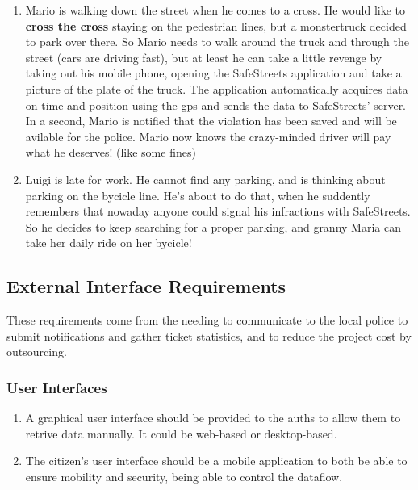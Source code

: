 \documentclass{article}
\newcommand{\enum}[1]{\texttt{#1.\arabic*}}
\begin{document}
			\begin{enumerate}[label=\enum{S}]
				\item \label{S_The man, the street and the monstertruck}
				Mario is walking down the street when he comes to a cross. He would like to \textbf{cross the cross} staying on the pedestrian lines, but a monstertruck decided to park over there. So Mario needs to walk around the truck and through the street (cars are driving fast), but at least he can take a little revenge by taking out his mobile phone, opening the SafeStreets application and take a picture of the plate of the truck. The application automatically acquires data on time and position using the gps and sends the data to SafeStreets' server. In a second, Mario is notified that the violation has been saved and will be avilable for the police.
Mario now knows the crazy-minded driver will pay what he deserves! (like some fines)
				\item \label{S_Prevent is better than healing}Luigi is late for work. He cannot find any parking, and is thinking about parking on the bycicle line. He's about to do that, when he suddently remembers that nowaday anyone could signal his infractions with SafeStreets. So he decides to keep searching for a proper parking, and granny Maria can take her daily ride on her bycicle!
			\end{enumerate}

	\subsection{External Interface Requirements}
		These requirements come from the needing to communicate to the local police to submit notifications and gather ticket statistics, and to reduce the project cost by outsourcing.
		
		\subsubsection{User Interfaces}
			\begin{enumerate}[label=\enum{UI}]
				\item A graphical user interface should be provided to the auths to allow them to retrive data manually. It could be web-based or desktop-based.
				\item \label{UI_mobileApp}The citizen's user interface should be a mobile application to both be able to ensure mobility and security, being able to control the dataflow.
			\end{enumerate}
			
\end{document}
